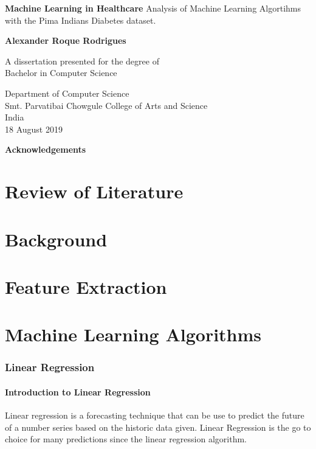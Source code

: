 \documentclass[12pt]{article}
\begin{document}
\begin{titlepage}
    \begin{center}
        \vspace*{1cm} 
        \Huge
        \textbf{Machine Learning in Healthcare} 
        \vspace{0.5cm}
        \normalsize
        \vspace{0cm}
        Analysis of Machine Learning Algortihms with the Pima Indians Diabetes dataset.
 
        \vspace{1.5cm}
 
        \textbf{Alexander Roque Rodrigues}
 
        \vfill
 
        A dissertation presented for the degree of\\
        Bachelor in Computer Science
 
        \vspace{0.8cm}
  
        \Large
        Department of Computer Science\\        
        Smt. Parvatibai Chowgule College of Arts and Science\\
        India\\
        18 August 2019
 
    \end{center}
\end{titlepage}
\Huge
\newpage
\huge
\textbf{Acknowledgements}
\normalsize
\newpage
\tableofcontents
\newpage
\part{Review of Literature}
\newpage
\part{Background}
\newpage
\part{Feature Extraction}
\newpage
\part{Machine Learning Algorithms}
\newpage
\section{Linear Regression}
\subsection{Introduction to Linear Regression}
Linear regression is a forecasting technique that can be use to predict the future of a number series based on the historic data given. Linear Regression is the go to choice for many predictions since the linear regression algorithm.
\end{document}
